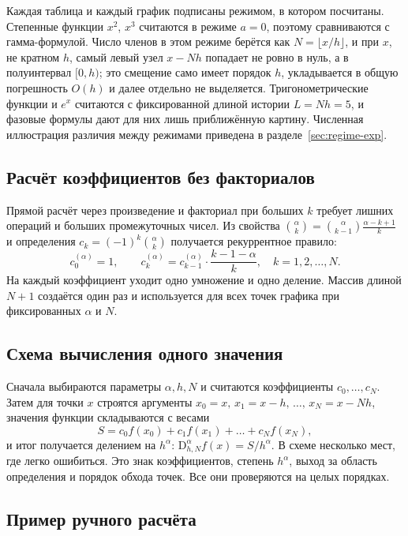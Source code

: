 \documentclass[14pt,a4paper]{extarticle}
\newcommand{\D}{\mathrm{D}}
\begin{document}
Каждая таблица и каждый график подписаны режимом, в котором посчитаны. Степенные функции $x^2$, $x^3$ считаются в режиме $a=0$, поэтому сравниваются с гамма-формулой. Число членов в этом режиме берётся как $N=\lfloor x/h\rfloor$, и при $x$, не кратном $h$, самый левый узел $x-Nh$ попадает не ровно в нуль, а в полуинтервал $[0,h)$; это смещение само имеет порядок $h$, укладывается в общую погрешность $O(h)$ и далее отдельно не выделяется. Тригонометрические функции и $e^x$ считаются с фиксированной длиной истории $L=Nh=5$, и фазовые формулы дают для них лишь приближённую картину. Численная иллюстрация различия между режимами приведена в разделе~\ref{sec:regime-exp}.

\subsection{Расчёт коэффициентов без факториалов}

Прямой расчёт через произведение и факториал при больших $k$ требует лишних операций и больших промежуточных чисел. Из свойства $\binom{\alpha}{k}=\binom{\alpha}{k-1}\frac{\alpha-k+1}{k}$ и определения $c_k=(-1)^k\binom{\alpha}{k}$ получается рекуррентное правило:
\begin{equation}
c_0^{(\alpha)}=1,\qquad c_k^{(\alpha)}=c_{k-1}^{(\alpha)}\cdot\frac{k-1-\alpha}{k},\quad k=1,2,\dots,N.
\label{eq:rec}
\end{equation}
На каждый коэффициент уходит одно умножение и одно деление. Массив длиной $N+1$ создаётся один раз и используется для всех точек графика при фиксированных $\alpha$ и $N$.

\subsection{Схема вычисления одного значения}

Сначала выбираются параметры $\alpha,h,N$ и считаются коэффициенты $c_0,\dots,c_N$. Затем для точки $x$ строятся аргументы $x_0=x,\,x_1=x-h,\,\dots,\,x_N=x-Nh$, значения функции складываются с весами
\begin{equation}
S=c_0 f(x_0)+c_1 f(x_1)+\dots+c_N f(x_N),
\end{equation}
и итог получается делением на $h^{\alpha}$: $\D^{\alpha}_{h,N}f(x)=S/h^{\alpha}$. В схеме несколько мест, где легко ошибиться. Это знак коэффициентов, степень $h^{\alpha}$, выход за область определения и порядок обхода точек. Все они проверяются на целых порядках.

\subsection{Пример ручного расчёта}
\end{document}
